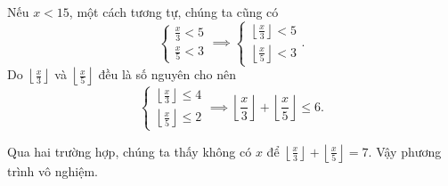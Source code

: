 Nếu $x < 15$, một cách tương tự, chúng ta cũng có
\begin{equation*}
   \begin{cases}
      \frac{x}{3} < 5 \\
      \frac{x}{5} < 3
   \end{cases} \implies \begin{cases}
      \left\lfloor \frac{x}{3} \right\rfloor < 5 \\
      \left\lfloor \frac{x}{5} \right\rfloor < 3
   \end{cases}.
\end{equation*}
Do $\left\lfloor \frac{x}{3} \right\rfloor$ và $\left\lfloor \frac{x}{5} \right\rfloor$ đều là số nguyên cho nên
$$
\begin{cases}
   \left\lfloor \frac{x}{3} \right\rfloor \leq 4 \\
   \left\lfloor \frac{x}{5} \right\rfloor \leq 2
\end{cases} \implies \left\lfloor \frac{x}{3} \right\rfloor + \left\lfloor \frac{x}{5} \right\rfloor \leq 6.
$$

Qua hai trường hợp, chúng ta thấy không có $x$ để $\left\lfloor \frac{x}{3} \right\rfloor + \left\lfloor \frac{x}{5} \right\rfloor = 7$. Vậy phương trình vô nghiệm.
